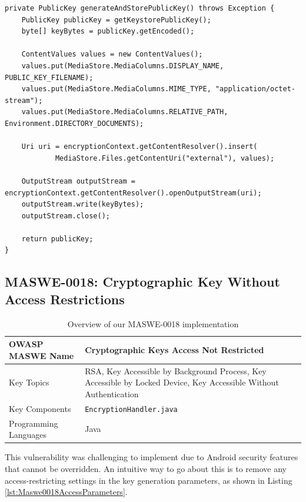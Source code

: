 \begin{lstlisting}[style=JavaStyle, float=tbh, captionpos=b, caption={Exporting a public RSA key to untrusted storage without protecting it}, label={lst:Maswe0017ExportingKeyWithoutProtection}]
private PublicKey generateAndStorePublicKey() throws Exception {
    PublicKey publicKey = getKeystorePublicKey();
    byte[] keyBytes = publicKey.getEncoded();

    ContentValues values = new ContentValues();
    values.put(MediaStore.MediaColumns.DISPLAY_NAME, PUBLIC_KEY_FILENAME);
    values.put(MediaStore.MediaColumns.MIME_TYPE, "application/octet-stream");
    values.put(MediaStore.MediaColumns.RELATIVE_PATH, Environment.DIRECTORY_DOCUMENTS);

    Uri uri = encryptionContext.getContentResolver().insert(
            MediaStore.Files.getContentUri("external"), values);

    OutputStream outputStream = encryptionContext.getContentResolver().openOutputStream(uri);
    outputStream.write(keyBytes);
    outputStream.close();

    return publicKey;
}
\end{lstlisting}



\subsection{MASWE-0018: Cryptographic Key Without Access Restrictions}
\label{subsec:maswe-0018}

\begin{table}[H]
    \centering
    \renewcommand{\arraystretch}{1.3}
        \begin{tabular}{p{5cm} p{8cm}} 
        \toprule
        OWASP MASWE Name & Cryptographic Keys Access Not Restricted \\ 
        \midrule
        Key Topics & RSA, Key Accessible by Background Process, Key Accessible by Locked Device, Key Accessible Without Authentication \\
        Key Components & \texttt{EncryptionHandler.java} \\
        Programming Languages & Java \\ 
        \bottomrule
        \end{tabular}
    \caption{Overview of our MASWE-0018 implementation}
    \label{tab:maswe-0018}
\end{table}

This vulnerability was challenging to implement due to Android security features that cannot be overridden. An intuitive way to go about this is to remove any access-restricting settings in the key generation parameters, as shown in Listing \ref{lst:Maswe0018AccessParameters}. 

